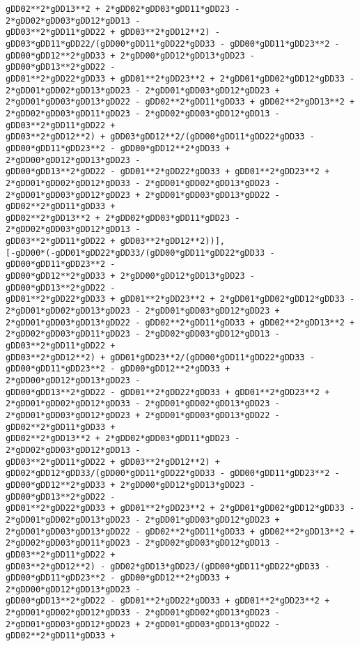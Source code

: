\documentclass[landscape,letterpaper,10pt,english]{article}
\begin{document}
\begin{Verbatim}[commandchars=\\\{\}]
gDD02**2*gDD13**2 + 2*gDD02*gDD03*gDD11*gDD23 - 2*gDD02*gDD03*gDD12*gDD13 -
gDD03**2*gDD11*gDD22 + gDD03**2*gDD12**2) -
gDD03*gDD11*gDD22/(gDD00*gDD11*gDD22*gDD33 - gDD00*gDD11*gDD23**2 -
gDD00*gDD12**2*gDD33 + 2*gDD00*gDD12*gDD13*gDD23 - gDD00*gDD13**2*gDD22 -
gDD01**2*gDD22*gDD33 + gDD01**2*gDD23**2 + 2*gDD01*gDD02*gDD12*gDD33 -
2*gDD01*gDD02*gDD13*gDD23 - 2*gDD01*gDD03*gDD12*gDD23 +
2*gDD01*gDD03*gDD13*gDD22 - gDD02**2*gDD11*gDD33 + gDD02**2*gDD13**2 +
2*gDD02*gDD03*gDD11*gDD23 - 2*gDD02*gDD03*gDD12*gDD13 - gDD03**2*gDD11*gDD22 +
gDD03**2*gDD12**2) + gDD03*gDD12**2/(gDD00*gDD11*gDD22*gDD33 -
gDD00*gDD11*gDD23**2 - gDD00*gDD12**2*gDD33 + 2*gDD00*gDD12*gDD13*gDD23 -
gDD00*gDD13**2*gDD22 - gDD01**2*gDD22*gDD33 + gDD01**2*gDD23**2 +
2*gDD01*gDD02*gDD12*gDD33 - 2*gDD01*gDD02*gDD13*gDD23 -
2*gDD01*gDD03*gDD12*gDD23 + 2*gDD01*gDD03*gDD13*gDD22 - gDD02**2*gDD11*gDD33 +
gDD02**2*gDD13**2 + 2*gDD02*gDD03*gDD11*gDD23 - 2*gDD02*gDD03*gDD12*gDD13 -
gDD03**2*gDD11*gDD22 + gDD03**2*gDD12**2))],
[-gDD00*(-gDD01*gDD22*gDD33/(gDD00*gDD11*gDD22*gDD33 - gDD00*gDD11*gDD23**2 -
gDD00*gDD12**2*gDD33 + 2*gDD00*gDD12*gDD13*gDD23 - gDD00*gDD13**2*gDD22 -
gDD01**2*gDD22*gDD33 + gDD01**2*gDD23**2 + 2*gDD01*gDD02*gDD12*gDD33 -
2*gDD01*gDD02*gDD13*gDD23 - 2*gDD01*gDD03*gDD12*gDD23 +
2*gDD01*gDD03*gDD13*gDD22 - gDD02**2*gDD11*gDD33 + gDD02**2*gDD13**2 +
2*gDD02*gDD03*gDD11*gDD23 - 2*gDD02*gDD03*gDD12*gDD13 - gDD03**2*gDD11*gDD22 +
gDD03**2*gDD12**2) + gDD01*gDD23**2/(gDD00*gDD11*gDD22*gDD33 -
gDD00*gDD11*gDD23**2 - gDD00*gDD12**2*gDD33 + 2*gDD00*gDD12*gDD13*gDD23 -
gDD00*gDD13**2*gDD22 - gDD01**2*gDD22*gDD33 + gDD01**2*gDD23**2 +
2*gDD01*gDD02*gDD12*gDD33 - 2*gDD01*gDD02*gDD13*gDD23 -
2*gDD01*gDD03*gDD12*gDD23 + 2*gDD01*gDD03*gDD13*gDD22 - gDD02**2*gDD11*gDD33 +
gDD02**2*gDD13**2 + 2*gDD02*gDD03*gDD11*gDD23 - 2*gDD02*gDD03*gDD12*gDD13 -
gDD03**2*gDD11*gDD22 + gDD03**2*gDD12**2) +
gDD02*gDD12*gDD33/(gDD00*gDD11*gDD22*gDD33 - gDD00*gDD11*gDD23**2 -
gDD00*gDD12**2*gDD33 + 2*gDD00*gDD12*gDD13*gDD23 - gDD00*gDD13**2*gDD22 -
gDD01**2*gDD22*gDD33 + gDD01**2*gDD23**2 + 2*gDD01*gDD02*gDD12*gDD33 -
2*gDD01*gDD02*gDD13*gDD23 - 2*gDD01*gDD03*gDD12*gDD23 +
2*gDD01*gDD03*gDD13*gDD22 - gDD02**2*gDD11*gDD33 + gDD02**2*gDD13**2 +
2*gDD02*gDD03*gDD11*gDD23 - 2*gDD02*gDD03*gDD12*gDD13 - gDD03**2*gDD11*gDD22 +
gDD03**2*gDD12**2) - gDD02*gDD13*gDD23/(gDD00*gDD11*gDD22*gDD33 -
gDD00*gDD11*gDD23**2 - gDD00*gDD12**2*gDD33 + 2*gDD00*gDD12*gDD13*gDD23 -
gDD00*gDD13**2*gDD22 - gDD01**2*gDD22*gDD33 + gDD01**2*gDD23**2 +
2*gDD01*gDD02*gDD12*gDD33 - 2*gDD01*gDD02*gDD13*gDD23 -
2*gDD01*gDD03*gDD12*gDD23 + 2*gDD01*gDD03*gDD13*gDD22 - gDD02**2*gDD11*gDD33 +

\end{Verbatim}
\end{document}
